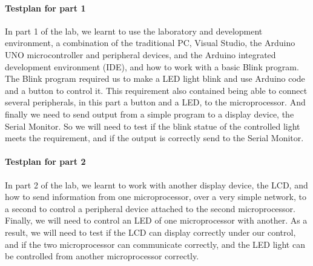 \paragraph{Testplan for part 1}
	In part 1 of the lab, we learnt to use the laboratory and development environment, a combination of the traditional PC, Visual Studio, the Arduino UNO microcontroller and peripheral devices, and the Arduino integrated development environment (IDE), and how to work with a basic Blink program. The Blink program required us to make a LED light blink and use Arduino code and a button to control it. This requirement also contained being able to connect several peripherals, in this part a button and a LED, to the microprocessor. And finally we need to send output from a simple program to a display device, the Serial Monitor. So we will need to test if the blink statue of the controlled light meets the requirement, and if the output is correctly send to the Serial Monitor.\\
\paragraph{Testplan for part 2}
	In part 2 of the lab, we learnt to work with another display device, the LCD, and how to send information from one microprocessor, over a very simple network, to a second to control a peripheral device attached to the second microprocessor. Finally, we will need to control an LED of one microprocessor with another. As a result, we will need to test if the LCD can display correctly under our control, and if the two microprocessor can communicate correctly, and the LED light can be controlled from another microprocessor correctly.\\